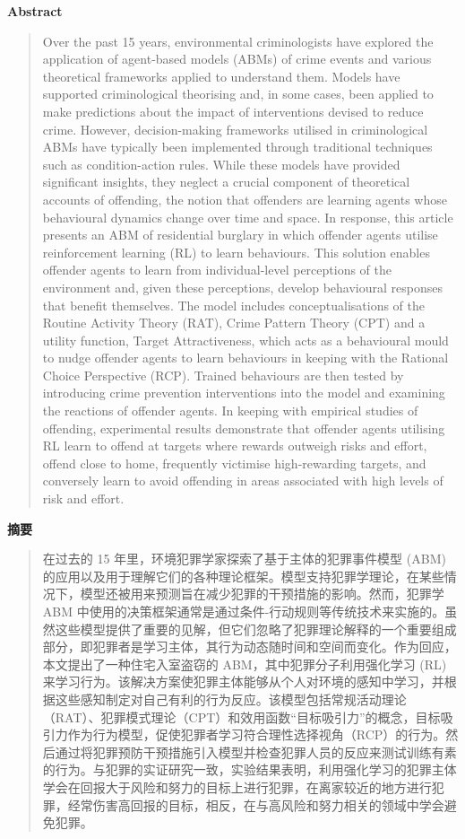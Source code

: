 \vspace{1.5em}
\noindent\textbf{Abstract}\par
\begin{quote}\small
Over the past 15 years, environmental criminologists have explored the application of agent-based models (ABMs) of crime events and various theoretical frameworks applied to understand them. Models have supported criminological theorising and, in some cases, been applied to make predictions about the impact of interventions devised to reduce crime. However, decision-making frameworks utilised in criminological ABMs have typically been implemented through traditional techniques such as condition-action rules. While these models have provided significant insights, they neglect a crucial component of theoretical accounts of offending, the notion that offenders are learning agents whose behavioural dynamics change over time and space. In response, this article presents an ABM of residential burglary in which offender agents utilise reinforcement learning (RL) to learn behaviours. This solution enables offender agents to learn from individual-level perceptions of the environment and, given these perceptions, develop behavioural responses that benefit themselves. The model includes conceptualisations of the Routine Activity Theory (RAT), Crime Pattern Theory (CPT) and a utility function, Target Attractiveness, which acts as a behavioural mould to nudge offender agents to learn behaviours in keeping with the Rational Choice Perspective (RCP). Trained behaviours are then tested by introducing crime prevention interventions into the model and examining the reactions of offender agents. In keeping with empirical studies of offending, experimental results demonstrate that offender agents utilising RL learn to offend at targets where rewards outweigh risks and effort, offend close to home, frequently victimise high-rewarding targets, and conversely learn to avoid offending in areas associated with high levels of risk and effort.
\end{quote}

\noindent\textbf{摘要}\par
\begin{quote}\small
在过去的 15 年里，环境犯罪学家探索了基于主体的犯罪事件模型 (ABM) 的应用以及用于理解它们的各种理论框架。模型支持犯罪学理论，在某些情况下，模型还被用来预测旨在减少犯罪的干预措施的影响。然而，犯罪学 ABM 中使用的决策框架通常是通过条件-行动规则等传统技术来实施的。虽然这些模型提供了重要的见解，但它们忽略了犯罪理论解释的一个重要组成部分，即犯罪者是学习主体，其行为动态随时间和空间而变化。作为回应，本文提出了一种住宅入室盗窃的 ABM，其中犯罪分子利用强化学习 (RL) 来学习行为。该解决方案使犯罪主体能够从个人对环境的感知中学习，并根据这些感知制定对自己有利的行为反应。该模型包括常规活动理论（RAT）、犯罪模式理论（CPT）和效用函数“目标吸引力”的概念，目标吸引力作为行为模型，促使犯罪者学习符合理性选择视角（RCP）的行为。然后通过将犯罪预防干预措施引入模型并检查犯罪人员的反应来测试训练有素的行为。与犯罪的实证研究一致，实验结果表明，利用强化学习的犯罪主体学会在回报大于风险和努力的目标上进行犯罪，在离家较近的地方进行犯罪，经常伤害高回报的目标，相反，在与高风险和努力相关的领域中学会避免犯罪。
\end{quote}

